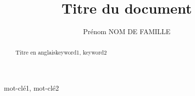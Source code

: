 \documentclass[letterpaper%
, twoside%
, 12pt%
, memoire%
, francais
, creativecommons, hyperref, withAlgo2e%
]{thETS}
\title{Titre du document}
\author{Prénom NOM DE FAMILLE}
\begin{document}

\maketitle

\presentjury

\begin{avantpropos}
	
\end{avantpropos}


\begin{remerciements}
	
\end{remerciements}


\begin{sommaire}{mot-clé1, mot-clé2}
	
\end{sommaire}


\begin{abstract}{Titre en anglais}{keyword1, keyword2}
	
\end{abstract}


\tableofcontents


\listoftables


\listoffigures


\begin{listofabbr}[3cm]
	
\end{listofabbr}


\begin{listofsymbols}[3cm]
	
\end{listofsymbols}


\cleardoublepage


\reversemarginpar


\begin{introduction}
	
\end{introduction}

\begin{revuedelitterature}
	
\end{revuedelitterature}
\end{document}
